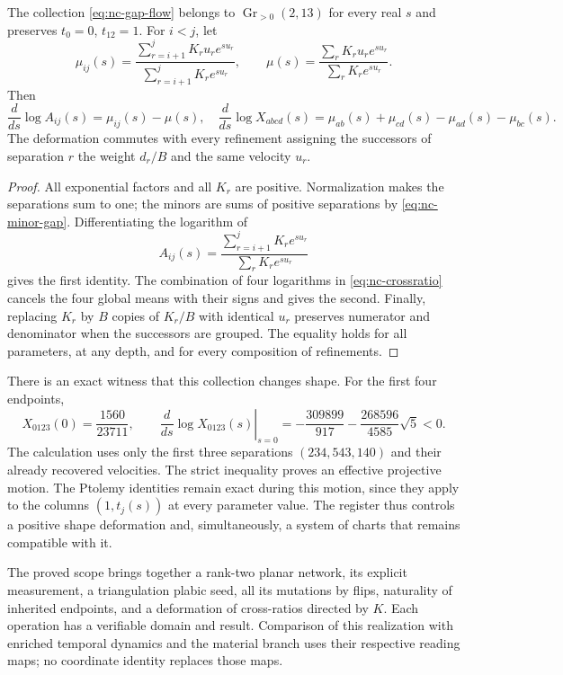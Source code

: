 \begin{theorem}
\label{thm:nc-shape-flow}
The collection \eqref{eq:nc-gap-flow} belongs to
\(\operatorname{Gr}_{>0}(2,13)\) for every real \(s\) and preserves
\(t_0=0\), \(t_{12}=1\). For \(i<j\), let
\[
 \mu_{ij}(s)=
 \frac{\sum_{r=i+1}^jK_ru_re^{su_r}}{\sum_{r=i+1}^jK_re^{su_r}},
 \qquad
 \mu(s)=\frac{\sum_rK_ru_re^{su_r}}{\sum_rK_re^{su_r}}.
\]
Then
\begin{equation}
 \frac{d}{ds}\log A_{ij}(s)=\mu_{ij}(s)-\mu(s),
 \quad
 \frac{d}{ds}\log X_{abcd}(s)
 =\mu_{ab}(s)+\mu_{cd}(s)-\mu_{ad}(s)-\mu_{bc}(s).
 \label{eq:nc-crossratio-derivative}
\end{equation}
The deformation commutes with every refinement assigning the successors
of separation \(r\) the weight \(d_r/B\) and the same velocity \(u_r\).
\end{theorem}
\begin{proof}
All exponential factors and all \(K_r\) are positive. Normalization
makes the separations sum to one; the minors are sums of positive
separations by \eqref{eq:nc-minor-gap}. Differentiating the logarithm of
\[
 A_{ij}(s)=\frac{\sum_{r=i+1}^jK_re^{su_r}}
                      {\sum_rK_re^{su_r}}
\]
gives the first identity. The combination of four logarithms in
\eqref{eq:nc-crossratio} cancels the four global means with their
signs and gives the second. Finally, replacing \(K_r\) by \(B\)
copies of \(K_r/B\) with identical \(u_r\) preserves numerator
and denominator when the successors are grouped. The equality holds
for all parameters, at any depth, and for every composition of refinements.
\end{proof}

There is an exact witness that this collection changes shape. For the
first four endpoints,
\begin{equation}
 X_{0123}(0)=\frac{1560}{23711},\qquad
 \left.\frac{d}{ds}\log X_{0123}(s)\right|_{s=0}
 =-\frac{309899}{917}-\frac{268596}{4585}\sqrt5<0.
 \label{eq:nc-nontrivial-witness}
\end{equation}
The calculation uses only the first three separations
\((234,543,140)\) and their already recovered velocities. The strict
inequality proves an effective projective motion. The Ptolemy identities
remain exact during this motion, since they apply to the columns
\((1,t_j(s))\) at every parameter value. The register thus controls
a positive shape deformation and, simultaneously, a system of charts
that remains compatible with it.

The proved scope brings together a rank-two planar network, its explicit
measurement, a triangulation plabic seed, all its mutations by flips,
naturality of inherited endpoints, and a deformation of cross-ratios
directed by \(K\). Each operation has a verifiable domain and result.
Comparison of this realization with enriched temporal dynamics and
the material branch uses their respective reading maps; no coordinate
identity replaces those maps.
